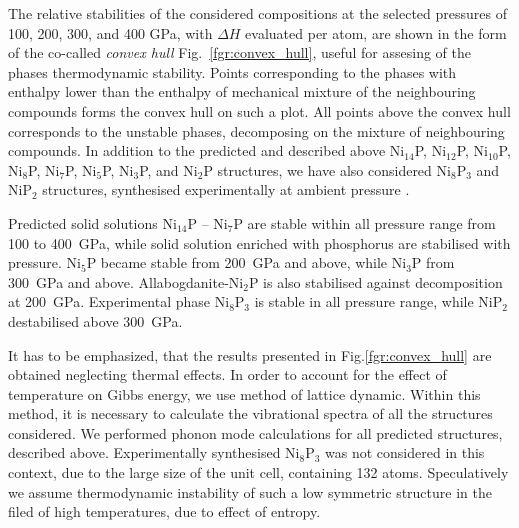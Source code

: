 \documentclass[twoside,twocolumn,9pt]{article}
\begin{document}
The relative stabilities of the considered compositions at the selected pressures of 100, 200, 300, and 400 GPa, with $\Delta H$ evaluated per atom, are shown in the form of the co-called {\it convex hull} Fig.~\ref{fgr:convex_hull}, useful for assesing of the phases thermodynamic stability. 
Points corresponding to the phases with enthalpy lower than the enthalpy of mechanical mixture of the neighbouring compounds forms the convex hull on such a plot.
All points above the convex hull corresponds to the unstable phases, decomposing on the mixture of neighbouring compounds.
In addition to the predicted and described above Ni$_{14}$P, Ni$_{12}$P, Ni$_{10}$P, Ni$_8$P, Ni$_7$P, Ni$_5$P, Ni$_3$P, and Ni$_2$P structures, we have also considered Ni$_8$P$_3$ and NiP$_2$ structures, synthesised experimentally at ambient pressure \cite{}.

Predicted solid solutions Ni$_{14}$P -- Ni$_7$P are stable within all pressure range from 100 to 400~GPa, while solid solution enriched with phosphorus are stabilised with pressure.
Ni$_5$P became stable from  200~GPa and above, while Ni$_3$P from 300~GPa and above. Allabogdanite-Ni$_2$P is also stabilised against decomposition at 200~GPa.
Experimental phase Ni$_8$P$_3$ is stable in all pressure range, while NiP$_2$ destabilised above 300~GPa.

It has to be emphasized, that the results presented in Fig.\ref{fgr:convex_hull} are obtained neglecting thermal effects. 
In order to account for the effect of temperature on Gibbs energy, we use method of lattice dynamic.
Within this method, it is necessary to calculate the vibrational spectra of all the structures considered. 
We performed phonon mode calculations for all predicted structures, described above. 
Experimentally synthesised Ni$_8$P$_3$ was not considered in this context, due to the large size of the unit cell, containing 132 atoms.
Speculatively we assume thermodynamic instability of such a low symmetric structure in the filed of high temperatures, due to effect of entropy.

\end{document}
